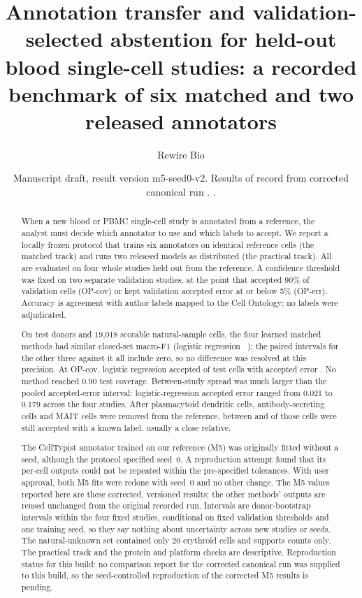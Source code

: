 \documentclass[11pt]{article}
\title{Annotation transfer and validation-selected abstention for held-out blood single-cell studies: a recorded benchmark of six matched and two released annotators}
\author{Rewire Bio}
\date{Manuscript draft, result version m5-seed0-v2. Results of record from corrected canonical run \runid. \Reprostatus.}
\newif\ifctreport
\newcommand{\reprostatus}{\ifctreport a seed-controlled reproduction of the corrected M5 results was run and compared with the corrected canonical run by the repository's tiered comparison; that internal comparison reports overall status ``\ctres{comparison}{report}{overall}''. This is an internal tolerance comparison by the same pipeline, not independent verification\else no comparison report for the corrected canonical run was supplied to this build, so the seed-controlled reproduction of the corrected M5 results is pending\fi}
\begin{document}
\maketitle

\begin{abstract}
\noindent When a new blood or PBMC single-cell study is annotated from a reference, the analyst must decide which annotator to use and which labels to accept. We report a locally frozen protocol that trains six annotators on identical reference cells (the matched track) and runs two released models as distributed (the practical track). All are evaluated on four whole studies held out from the reference. A confidence threshold was fixed on two separate validation studies, at the point that accepted 90\% of validation cells (OP-cov) or kept validation accepted error at or below 5\% (OP-err). Accuracy is agreement with author labels mapped to the Cell Ontology; no labels were adjudicated.

On  test donors and 19{,}018 scorable natural-sample cells, the four learned matched methods had similar closed-set macro-F1 (logistic regression ~); the paired intervals for the other three against it all include zero, so no difference was resolved at this precision. At OP-cov, logistic regression accepted  of test cells with accepted error . No method reached 0.90 test coverage. Between-study spread was much larger than the pooled accepted-error interval: logistic-regression accepted error ranged from 0.021 to 0.179 across the four studies. After plasmacytoid dendritic cells, antibody-secreting cells and MAIT cells were removed from the reference, between  and  of those cells were still accepted with a known label, usually a close relative.

The CellTypist annotator trained on our reference (M5) was originally fitted without a seed, although the protocol specified seed~0. A reproduction attempt found that its per-cell outputs could not be repeated within the pre-specified tolerances. With user approval, both M5 fits were redone with seed~0 and no other change. The M5 values reported here are these corrected, versioned results; the other methods' outputs are reused unchanged from the original recorded run. Intervals are donor-bootstrap intervals within the four fixed studies, conditional on fixed validation thresholds and one training seed, so they say nothing about uncertainty across new studies or seeds. The natural-unknown set contained only 20 erythroid cells and supports counts only. The practical track and the protein and platform checks are descriptive. Reproduction status for this build: \reprostatus.
\end{abstract}
\end{document}

